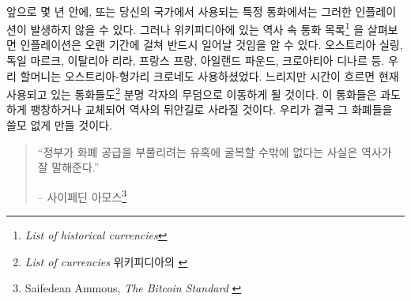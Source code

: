 \paragraph{}
앞으로 몇 년 안에, 또는 당신의 국가에서 사용되는 특정 통화에서는 그러한 인플레이션이 발생하지 않을 수 있다. 
그러나 위키피디아에 있는 역사 속 통화 목록\footnote{\textit{List of historical currencies}\cite{wiki:historical-currencies}}
을 살펴보면 인플레이션은 오랜 기간에 걸쳐 반드시 일어날 것임을 알 수 있다.
오스트리아 실링, 독일 마르크, 이탈리아 리라, 프랑스 프랑, 아일랜드 파운드, 크로아티아 디나르 등.
우리 할머니는 오스트리아-헝가리 크로네도 사용하셨었다. 
느리지만 시간이 흐르면 현재 사용되고 있는 통화들도\footnote{\textit{List of currencies} 위키피디아의 \cite{wiki:list-of-currencies}}
분명 각자의 무덤으로 이동하게 될 것이다.
이 통화들은 과도하게 팽창하거나 교체되어 역사의 뒤안길로 사라질 것이다.
우리가 결국 그 화폐들을 쓸모 없게 만들 것이다.

\begin{quotation}\begin{samepage}
		\enquote{정부가 화폐 공급을 부풀리려는 유혹에 굴복할 수밖에 없다는 사실은 역사가 잘 말해준다.}
		\begin{flushright} -- 사이페딘 아모스\footnote{Saifedean Ammous, \textit{The Bitcoin
					Standard} \cite{bitcoin-standard}}
\end{flushright}\end{samepage}\end{quotation}

